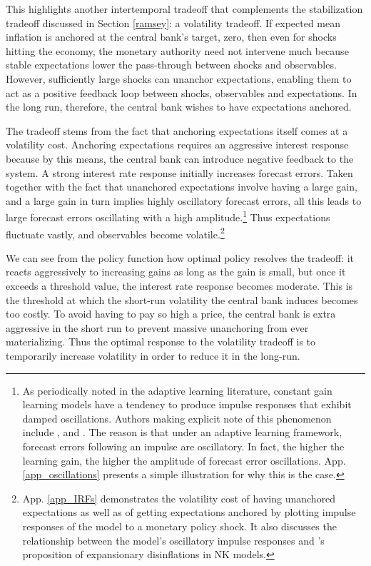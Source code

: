 \documentclass[11pt]{article}
\renewcommand{\[}{\begin{equation}}
\renewcommand{\]}{\end{equation}}
\begin{document}
This highlights another intertemporal tradeoff that complements the stabilization tradeoff discussed in Section \ref{ramsey}: a volatility tradeoff. If expected mean inflation is anchored at the central bank's target, zero, then even for shocks hitting the economy, the monetary authority need not intervene much because stable expectations lower the pass-through between shocks and observables. However, sufficiently large shocks can unanchor expectations, enabling them to act as a positive feedback loop between shocks, observables and expectations. In the long run, therefore, the central bank wishes to have expectations anchored. 

The tradeoff stems from the fact that anchoring expectations itself comes at a volatility cost. Anchoring expectations requires an aggressive interest response because by this means, the central bank can introduce negative feedback to the system. A strong interest rate response initially increases forecast errors. Taken together with the fact that unanchored expectations involve having a large gain, and a large gain in turn implies highly oscillatory forecast errors, all this leads to large forecast errors oscillating with a high amplitude.\footnote{As periodically noted in the adaptive learning literature, constant gain learning models have a tendency to produce impulse responses that exhibit damped oscillations. Authors making explicit note of this phenomenon include \cite{evans_honkapohja2001}, \cite{evans2013bayesian} and \cite{anufriev2012evolutionary}. The reason is that under an adaptive learning framework, forecast errors following an impulse are oscillatory.  In fact, the higher the learning gain, the higher the amplitude of forecast error oscillations. App. \ref{app_oscillations} presents a simple illustration for why this is the case.} Thus expectations fluctuate vastly, and observables become volatile.\footnote{App. \ref{app_IRFs} demonstrates the volatility cost of having unanchored expectations as well as of getting expectations anchored by plotting impulse responses of the model to a monetary policy shock. It also discusses the relationship between the model's oscillatory impulse responses and \cite{ball1994credible}'s proposition of expansionary disinflations in NK models.} 

We can see from the policy function how optimal policy resolves the tradeoff: it reacts aggressively to increasing gains as long as the gain is small, but once it exceeds a threshold value, the interest rate response becomes moderate. This is the threshold at which the short-run volatility the central bank induces becomes too costly. To avoid having to pay so high a price, the central bank is extra aggressive in the short run to prevent massive unanchoring from ever materializing. Thus the optimal response to the volatility tradeoff is to temporarily increase volatility in order to reduce it in the long-run.
\end{document}
